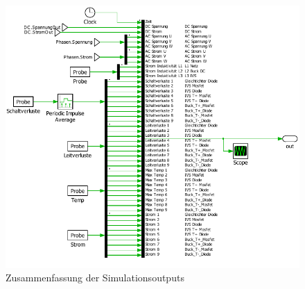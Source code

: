 \begin{figure}
\centering
\includegraphics[width=1\linewidth]{content/Grafiken/Plecs_Out}
\caption{Zusammenfassung der Simulationsoutputs}
\label{fig:plecsout}
\end{figure}


